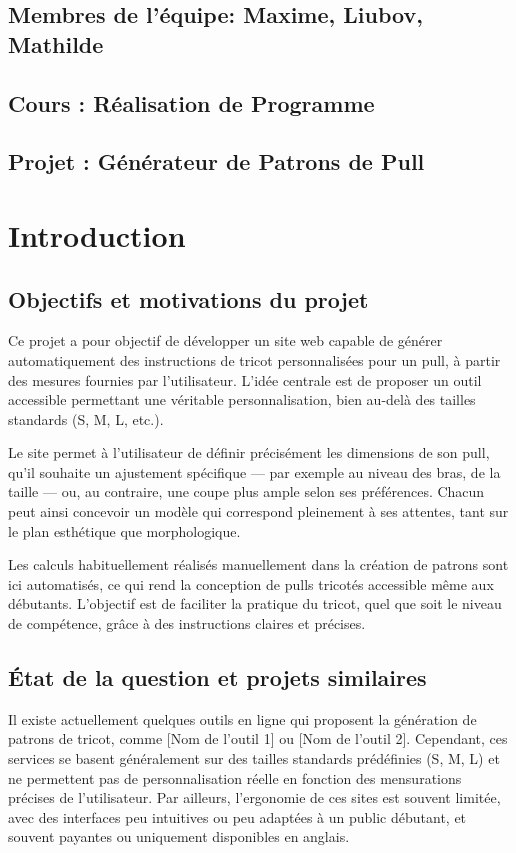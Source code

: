 \documentclass{article}
\begin{document}
	
\subsection*{Membres de l’équipe: \textbf{Maxime, Liubov, Mathilde}}
\subsection*{Cours : \textbf{Réalisation de Programme}}
\subsection*{Projet : \textbf{Générateur de Patrons de Pull}}

	\newpage
	\tableofcontents
	
	\newpage %


	\section{Introduction}
	\subsection{Objectifs et motivations du projet}
	
	Ce projet a pour objectif de développer un site web capable de générer automatiquement des instructions de tricot personnalisées pour un pull, à partir des mesures fournies par l’utilisateur. L’idée centrale est de proposer un outil accessible permettant une véritable personnalisation, bien au-delà des tailles standards (S, M, L, etc.).
	
	Le site permet à l’utilisateur de définir précisément les dimensions de son pull, qu’il souhaite un ajustement spécifique — par exemple au niveau des bras, de la taille — ou, au contraire, une coupe plus ample selon ses préférences. Chacun peut ainsi concevoir un modèle qui correspond pleinement à ses attentes, tant sur le plan esthétique que morphologique.
	
	Les calculs habituellement réalisés manuellement dans la création de patrons sont ici automatisés, ce qui rend la conception de pulls tricotés accessible même aux débutants. L’objectif est de faciliter la pratique du tricot, quel que soit le niveau de compétence, grâce à des instructions claires et précises.
	
	\subsection{État de la question et projets similaires}
	Il existe actuellement quelques outils en ligne qui proposent la génération de patrons de tricot, comme [Nom de l’outil 1] ou [Nom de l’outil 2]. Cependant, ces services se basent généralement sur des tailles standards prédéfinies (S, M, L) et ne permettent pas de personnalisation réelle en fonction des mensurations précises de l’utilisateur. Par ailleurs, l’ergonomie de ces sites est souvent limitée, avec des interfaces peu intuitives ou peu adaptées à un public débutant, et souvent payantes ou uniquement disponibles en anglais.
	
\end{document}
